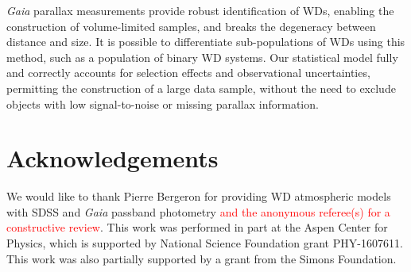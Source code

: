 \documentclass[fleqn,usenatbib]{mnras}
\newcommand{\changes}[1]{\textcolor{red}{#1}}
\begin{document}
\emph{Gaia} parallax measurements provide robust identification of WDs, enabling the construction of volume-limited samples, and breaks the degeneracy between distance and size. It is possible to differentiate sub-populations of WDs using this method, such as a population of binary WD systems. Our statistical model fully and correctly accounts for selection effects and observational uncertainties, permitting the construction of a large data sample, without the need to exclude objects with low signal-to-noise or missing parallax information.



\section*{Acknowledgements}

We would like to thank Pierre Bergeron for providing WD atmospheric models with SDSS and \emph{Gaia} passband photometry \changes{and the anonymous referee(s) for a constructive review}. This work was performed in part at the Aspen Center for Physics, which is supported by National Science Foundation grant PHY-1607611. This work was also partially supported by a grant from the Simons Foundation.











\bsp	%
\label{lastpage}
\end{document}
